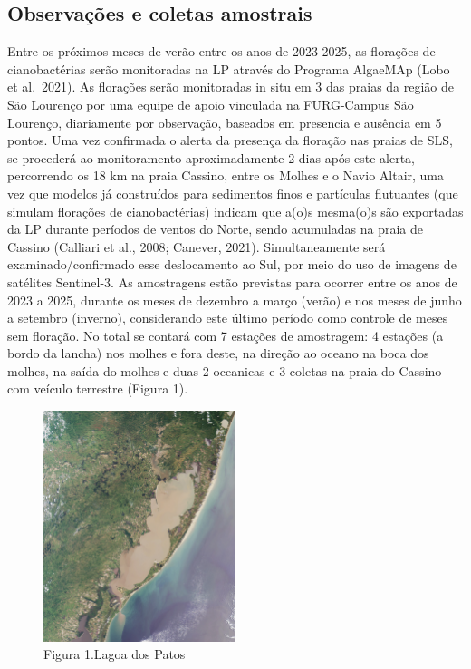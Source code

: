 \documentclass[
  super,
  preprint,
  3p]{elsarticle}
\begin{document}
\hypertarget{observauxe7uxf5es-e-coletas-amostrais}{%
\subsection{Observações e coletas
amostrais}\label{observauxe7uxf5es-e-coletas-amostrais}}

Entre os próximos meses de verão entre os anos de 2023-2025, as
florações de cianobactérias serão monitoradas na LP através do Programa
AlgaeMAp (Lobo et al.~2021). As florações serão monitoradas in situ em 3
das praias da região de São Lourenço por uma equipe de apoio vinculada
na FURG-Campus São Lourenço, diariamente por observação, baseados em
presencia e ausência em 5 pontos. Uma vez confirmada o alerta da
presença da floração nas praias de SLS, se procederá ao monitoramento
aproximadamente 2 dias após este alerta, percorrendo os 18 km na praia
Cassino, entre os Molhes e o Navio Altair, uma vez que modelos já
construídos para sedimentos finos e partículas flutuantes (que simulam
florações de cianobactérias) indicam que a(o)s mesma(o)s são exportadas
da LP durante períodos de ventos do Norte, sendo acumuladas na praia de
Cassino (Calliari et al., 2008; Canever, 2021). Simultaneamente será
examinado/confirmado esse deslocamento ao Sul, por meio do uso de
imagens de satélites Sentinel-3. As amostragens estão previstas para
ocorrer entre os anos de 2023 a 2025, durante os meses de dezembro a
março (verão) e nos meses de junho a setembro (inverno), considerando
este último período como controle de meses sem floração. No total se
contará com 7 estações de amostragem: 4 estações (a bordo da lancha) nos
molhes e fora deste, na direção ao oceano na boca dos molhes, na saída
do molhes e duas 2 oceanicas e 3 coletas na praia do Cassino com veículo
terrestre (Figura 1).

\begin{figure}

{\centering \includegraphics[width=0.5\textwidth,height=\textheight]{Lagoa_dos_Patos.jpg}

}

\caption{Figura 1.Lagoa dos Patos}

\end{figure}
\end{document}
